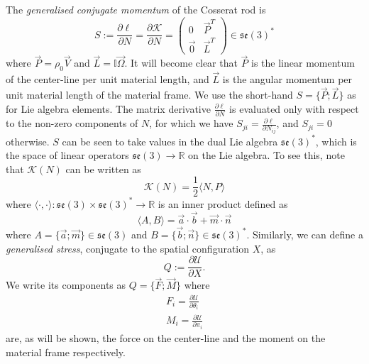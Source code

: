 The \textit{generalised conjugate momentum} of the Cosserat rod is
\begin{equation}
S := \frac{\partial \ell}{\partial N}  = \frac{\partial \mathcal{K}}{\partial N} = \begin{pmatrix}
0 & \vec{P}^T \\ 
\vec{0} & \vec{L}^T
\end{pmatrix}  \in \mathfrak{se}(3)^*
\end{equation}
where $\vec{P} = \rho_0 \vec{V}$ and $\vec{L} = \mathbb{I} \vec{\Omega}$. It will become clear that $\vec{P}$ is the linear momentum of the center-line per unit material length, and $\vec{L}$ is the angular momentum per unit material length of the material frame. We use the short-hand $S = \{ \vec{P} ; \vec{L} \}$ as for Lie algebra elements. The matrix derivative $\frac{\partial \ell}{\partial N}$ is evaluated only with respect to the non-zero components of $N$, for which we have $S_{ji} = \frac{\partial \ell}{\partial N_{ij}}$, and $S_{ji} = 0$ otherwise. $S$ can be seen to take values in the dual Lie algebra $\mathfrak{se}(3)^*$, which is the space of linear operators $\mathfrak{se}(3) \to \mathbb{R}$ on the Lie algebra. To see this, note that $\mathcal{K}(N)$ can be written as
\begin{equation}
\mathcal{K}(N) = \frac{1}{2} \langle N, P \rangle
\end{equation}
where $\langle \cdot , \cdot \rangle : \mathfrak{se}(3) \times \mathfrak{se}(3)^* \to \mathbb{R}$ is an inner product defined as
\begin{equation}
\langle A , B \rangle =  \vec{a} \cdot \vec{b} + \vec{m} \cdot \vec{n}
\end{equation}
where $A = \{\vec{a}; \vec{m}\} \in \mathfrak{se}(3)$ and $B = \{\vec{b}; \vec{n}\} \in \mathfrak{se}(3)^*$. Similarly, we can define a \textit{generalised stress}, conjugate to the spatial configuration $X$, as
\begin{equation}
Q := \frac{\partial \mathcal{U}}{\partial X}.
\end{equation}
We write its components as $Q = \{ \vec{F} ; \vec{M} \}$ where
\begin{subequations} \label{eq:F_i and M_i from U}
\begin{align}
F_i = \frac{\partial \mathcal{U}}{\partial \theta_i} \\
M_i = \frac{\partial \mathcal{U}}{\partial \pi_i} 
\end{align}
\end{subequations}
are, as will be shown, the force on the center-line and the moment on the material frame respectively.

